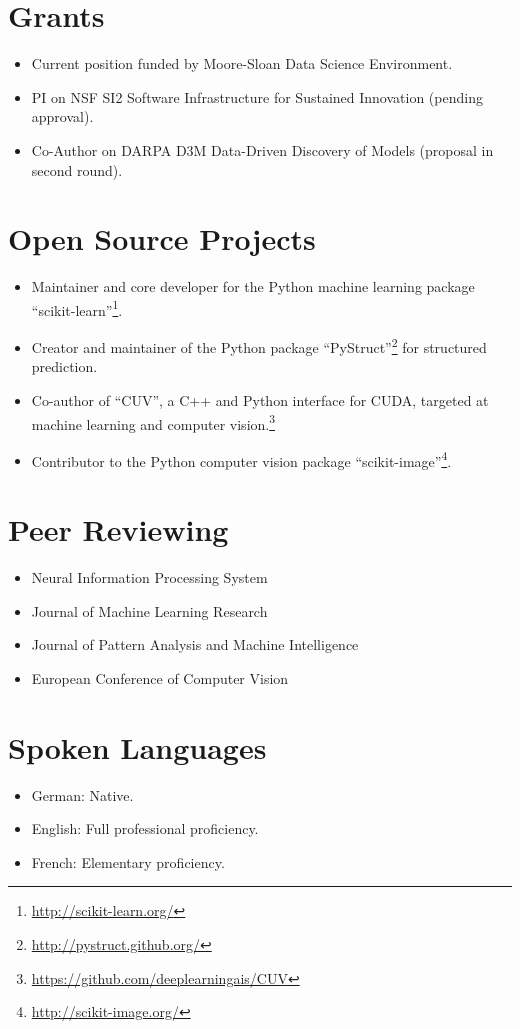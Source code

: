 \documentclass[a4paper,11pt]{article}
\begin{document}
\section{Grants}
\begin{itemize}
    \item Current position funded by Moore-Sloan Data Science Environment.
    \item PI on NSF SI2 Software Infrastructure for Sustained Innovation (pending approval).
    \item Co-Author on DARPA D3M Data-Driven Discovery of Models (proposal in second round).
\end{itemize}

\section{Open Source Projects}
\begin{itemize}
    \item Maintainer and core developer for the Python machine learning package ``scikit-learn''\footnote{\url{http://scikit-learn.org/}}.
    \item Creator and maintainer of the Python package ``PyStruct''\footnote{\url{http://pystruct.github.org/}} for structured prediction.
    \item Co-author of ``CUV'', a C++ and Python interface for CUDA,
        targeted at machine learning and computer vision.\footnote{\url{https://github.com/deeplearningais/CUV}}
    \item Contributor to the Python computer vision package ``scikit-image''\footnote{\url{http://scikit-image.org/}}.
\end{itemize}
\pagebreak

\section{Peer Reviewing}
\begin{itemize}
    \item Neural Information Processing System
    \item Journal of Machine Learning Research
    \item Journal of Pattern Analysis and Machine Intelligence
    \item European Conference of Computer Vision
\end{itemize}

\section{Spoken Languages}
\begin{itemize}
    \item German: Native.
    \item English: Full professional proficiency.
    \item French: Elementary proficiency.
\end{itemize}
\end{document}
